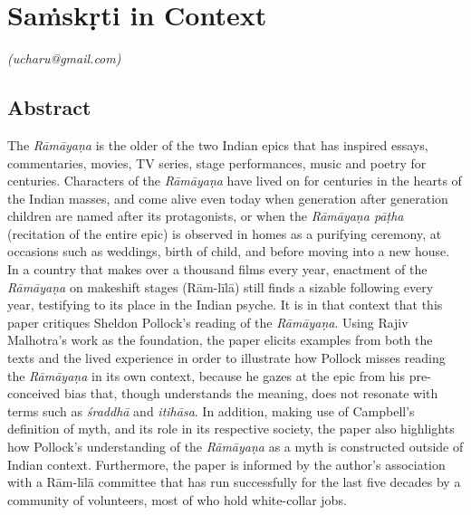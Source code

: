 
\chapter{Saṁskṛti in Context}\label{chapter8}


\begin{flushright}
\textit{\sf\em (ucharu@gmail.com)}
\end{flushright}

\section*{Abstract}

The \textit{Rāmāyaṇa} is the older of the two Indian epics that has inspired essays, commentaries, movies, TV series, stage performances, music and poetry for centuries. Characters of the \textit{Rāmāyaṇa} have lived on for centuries in the hearts of the Indian masses, and come alive even today when generation after generation children are named after its protagonists, or when the \textit{Rāmāyaṇa pāṭha} (recitation of the entire epic) is observed in homes as a purifying ceremony, at occasions such as weddings, birth of child, and before moving into a new house. In a country that makes over a thousand films every year, enactment of the \textit{Rāmāyaṇa} on makeshift stages (Rām-līlā) still finds a sizable following every year, testifying to its place in the Indian psyche. It is in that context that this paper critiques Sheldon Pollock’s reading of the \textit{Rāmāyaṇa}. Using Rajiv Malhotra’s work as the foundation, the paper elicits examples from both the texts and the lived experience in order to illustrate how Pollock misses reading the \textit{Rāmāyaṇa} in its own context, because he gazes at the epic from his pre-conceived bias that, though understands the meaning, does not resonate with terms such as \textit{śraddhā} and \textit{itihāsa}. In addition, making use of Campbell’s definition of myth, and its role in its respective society, the paper also highlights how Pollock’s understanding of the \textit{Rāmāyaṇa} as a myth is constructed outside of Indian context. Furthermore, the paper is informed by the author’s association with a Rām-līlā committee that has run successfully for the last five decades by a community of volunteers, most of who hold white-collar jobs.

